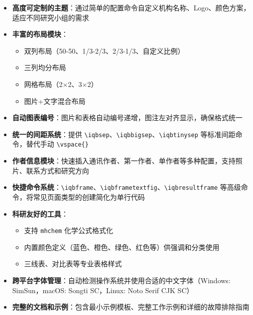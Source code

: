 \begin{itemize}
    \item \textbf{高度可定制的主题}：通过简单的配置命令自定义机构名称、Logo、颜色方案，适应不同研究小组的需求

    \item \textbf{丰富的布局模块}：
    \begin{itemize}
        \item 双列布局（50-50、1/3-2/3、2/3-1/3、自定义比例）
        \item 三列均分布局
        \item 网格布局（2×2、3×2）
        \item 图片+文字混合布局
    \end{itemize}

    \item \textbf{自动图表编号}：图片和表格自动编号递增，图注左对齐显示，确保格式统一

    \item \textbf{统一的间距系统}：提供 \lstinline|\iqbsep|、\lstinline|\iqbbigsep|、\lstinline|\iqbtinysep| 等标准间距命令，替代手动 \lstinline|\vspace{}|

    \item \textbf{作者信息模块}：快速插入通讯作者、第一作者、单作者等多种配置，支持照片、联系方式和研究方向

    \item \textbf{快捷命令系统}：\lstinline|\iqbframe|、\lstinline|\iqbframetextfig|、\lstinline|\iqbresultframe| 等高级命令，将常见页面类型的创建简化为单行代码

    \item \textbf{科研友好的工具}：
    \begin{itemize}
        \item 支持 \lstinline|mhchem| 化学公式格式化
        \item 内置颜色定义（蓝色、橙色、绿色、红色等）供强调和分类使用
        \item 三线表、对比表等专业表格样式
    \end{itemize}

    \item \textbf{跨平台字体管理}：自动检测操作系统并使用合适的中文字体（Windows: SimSun，macOS: Songti SC，Linux: Noto Serif CJK SC）

    \item \textbf{完整的文档和示例}：包含最小示例模板、完整工作示例和详细的故障排除指南
\end{itemize}

